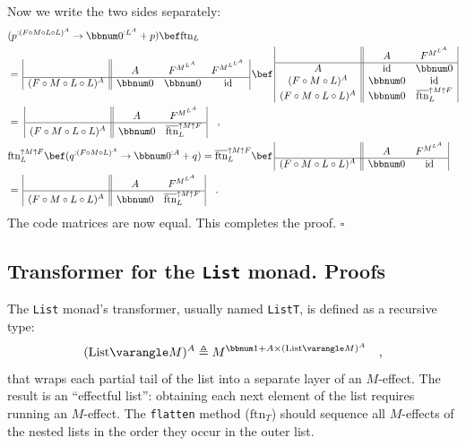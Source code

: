 Now we write the two sides separately:
\begin{align*}
 & (p^{:(F\circ M\circ L\circ L)^{A}}\rightarrow\bbnum 0^{:L^{A}}+p)\bef\text{ftn}_{L}\\
 & =\,\begin{array}{|c||ccc|}
 & A & F^{M^{L^{A}}} & F^{M^{L^{L^{A}}}}\\
\hline (F\circ M\circ L\circ L)^{A} & \bbnum 0 & \bbnum 0 & \text{id}
\end{array}\,\bef\,\begin{array}{|c||cc|}
 & A & F^{M^{L^{A}}}\\
\hline A & \text{id} & \bbnum 0\\
(F\circ M\circ L)^{A} & \bbnum 0 & \text{id}\\
(F\circ M\circ L\circ L)^{A} & \bbnum 0 & \overline{\text{ftn}}_{L}^{\uparrow M\uparrow F}
\end{array}\\
 & =\,\,\begin{array}{|c||cc|}
 & A & F^{M^{L^{A}}}\\
\hline (F\circ M\circ L\circ L)^{A} & \bbnum 0 & \overline{\text{ftn}}_{L}^{\uparrow M\uparrow F}
\end{array}\quad,\\
 & \text{ftn}_{L}^{\uparrow M\uparrow F}\bef(q^{:(F\circ M\circ L)^{A}}\rightarrow\bbnum 0^{:A}+q)=\overline{\text{ftn}}_{L}^{\uparrow M\uparrow F}\bef\,\begin{array}{|c||cc|}
 & A & F^{M^{L^{A}}}\\
\hline (F\circ M\circ L\circ L)^{A} & \bbnum 0 & \text{id}
\end{array}\\
 & =\,\begin{array}{|c||cc|}
 & A & F^{M^{L^{A}}}\\
\hline (F\circ M\circ L\circ L)^{A} & \bbnum 0 & \overline{\text{ftn}}_{L}^{\uparrow M\uparrow F}
\end{array}\quad.
\end{align*}
The code matrices are now equal. This completes the proof. $\square$

\subsection{Transformer for the \texttt{List} monad. Proofs\label{subsec:Transformer-for-the-List-monad}}

The \lstinline!List! monad\textsf{'}s transformer, usually named \lstinline!ListT!,
is defined as a recursive type:
\[
(\text{List}\varangle M)^{A}\triangleq M^{\bbnum 1+A\times(\text{List}\varangle M)^{A}}\quad,
\]
that wraps each partial tail of the list into a separate layer of
an $M$-effect. The result is an \textsf{``}effectful list\textsf{''}: obtaining each
next element of the list requires running an $M$-effect. The \lstinline!flatten!
method ($\text{ftn}_{T}$) should sequence all $M$-effects of the
nested lists in the order they occur in the outer list.

